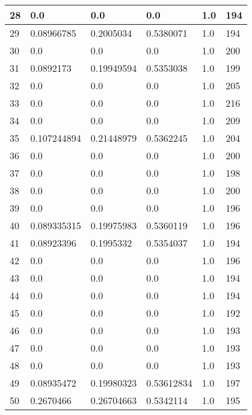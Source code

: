 \begin{longtable}{|l|l|l|l|l|l|}
28 & 0.0 & 0.0 & 0.0 & 1.0 & 194 \\ \hline 
29 & 0.08966785 & 0.2005034 & 0.5380071 & 1.0 & 194 \\ \hline 
30 & 0.0 & 0.0 & 0.0 & 1.0 & 200 \\ \hline 
31 & 0.0892173 & 0.19949594 & 0.5353038 & 1.0 & 199 \\ \hline 
32 & 0.0 & 0.0 & 0.0 & 1.0 & 205 \\ \hline 
33 & 0.0 & 0.0 & 0.0 & 1.0 & 216 \\ \hline 
34 & 0.0 & 0.0 & 0.0 & 1.0 & 209 \\ \hline 
35 & 0.107244894 & 0.21448979 & 0.5362245 & 1.0 & 204 \\ \hline 
36 & 0.0 & 0.0 & 0.0 & 1.0 & 200 \\ \hline 
37 & 0.0 & 0.0 & 0.0 & 1.0 & 198 \\ \hline 
38 & 0.0 & 0.0 & 0.0 & 1.0 & 200 \\ \hline 
39 & 0.0 & 0.0 & 0.0 & 1.0 & 196 \\ \hline 
40 & 0.089335315 & 0.19975983 & 0.5360119 & 1.0 & 196 \\ \hline 
41 & 0.08923396 & 0.1995332 & 0.5354037 & 1.0 & 194 \\ \hline 
42 & 0.0 & 0.0 & 0.0 & 1.0 & 196 \\ \hline 
43 & 0.0 & 0.0 & 0.0 & 1.0 & 194 \\ \hline 
44 & 0.0 & 0.0 & 0.0 & 1.0 & 194 \\ \hline 
45 & 0.0 & 0.0 & 0.0 & 1.0 & 192 \\ \hline 
46 & 0.0 & 0.0 & 0.0 & 1.0 & 193 \\ \hline 
47 & 0.0 & 0.0 & 0.0 & 1.0 & 193 \\ \hline 
48 & 0.0 & 0.0 & 0.0 & 1.0 & 193 \\ \hline 
49 & 0.08935472 & 0.19980323 & 0.53612834 & 1.0 & 197 \\ \hline 
50 & 0.2670466 & 0.26704663 & 0.5342114 & 1.0 & 195 \\ \hline 
\end{longtable}